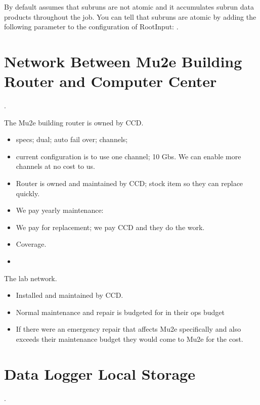 By default \art assumes that subruns are not atomic and it accumulates subrun data products throughout the job.
You can tell \art that subruns are atomic by adding the following parameter to the configuration of
RootInput: .


\chapter{Network Between Mu2e Building Router and Computer Center}
\label{app:RouterAndNetwork}.

The Mu2e building router is owned by CCD.
\begin{itemize}
\item specs; dual; auto fail over; channels;
\item current configuration is to use one channel; 10 Gbs.  We can enable more channels at no cost to us.
\item Router is owned and maintained by CCD; stock item so they can replace quickly.
\item We pay yearly maintenance: 
\item We pay for replacement; we pay CCD and they do the work. 
\item {} Coverage.
\item {}
\end{itemize}


The lab network.
\begin{itemize}
\item Installed and maintained by CCD.
\item Normal maintenance and repair is budgeted for in their ops budget
\item If there were an emergency repair that affects Mu2e specifically and also exceeds their maintenance budget they would come to Mu2e for the cost.
\end{itemize}

\chapter{Data Logger Local Storage}
\label{app:DataLoggerLocalStorage}

.

